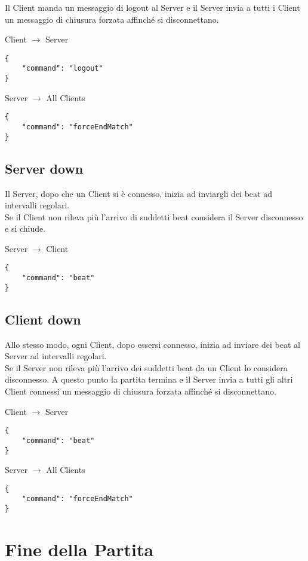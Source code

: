 \documentclass{article}
\begin{document}
\noindent Il Client manda un messaggio di logout al Server e il Server invia a tutti i Client un messaggio di chiusura forzata affinché si disconnettano.\\

\newpage

\noindent Client $\rightarrow$ Server
\begin{verbatim}
{
	"command": "logout"
}
\end{verbatim}
\bigskip
\noindent Server $\rightarrow$ All Clients
\begin{verbatim}
{
	"command": "forceEndMatch"
}
\end{verbatim}

\bigskip
\subsection{Server down}\label{serverdown}
Il Server, dopo che un Client si è connesso, inizia ad inviargli dei beat ad intervalli regolari.\\
Se il Client non rileva più l'arrivo di suddetti beat considera il Server disconnesso e si chiude.


\bigskip

\noindent Server $\rightarrow$ Client
\begin{verbatim}
{
	"command": "beat"
}
\end{verbatim}

\subsection{Client down}
Allo stesso modo, ogni Client, dopo essersi connesso, inizia ad inviare dei beat al Server ad intervalli regolari.\\
Se il Server non rileva più l'arrivo dei suddetti beat da un Client lo considera disconnesso. A questo punto la partita termina e il Server invia a tutti gli altri Client connessi un messaggio di chiusura forzata affinché si disconnettano.

\bigskip

\noindent Client $\rightarrow$ Server
\begin{verbatim}
{
	"command": "beat"
}
\end{verbatim}

\noindent Server $\rightarrow$ All Clients
\begin{verbatim}
{
	"command": "forceEndMatch"
}
\end{verbatim}

\bigskip
\section{Fine della Partita}
\end{document}
